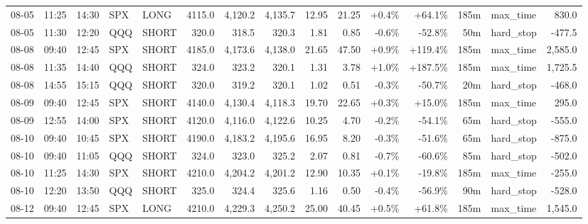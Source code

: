 \documentclass[11pt,a4paper,twoside]{article}
\begin{document}
\begin{landscape}
\begin{center}
\begin{longtable}{>{\color{txtmain}}l l l l l r r r r r r r r >{\color{txtmain}}l r}
08-05 & 11:25 & 14:30 & SPX & LONG & 4115.0 & 4,120.2 & 4,135.7 & 12.95 & 21.25 & \textcolor{wingreen}{+0.4\%} & \textcolor{wingreen}{+64.1\%} & 185m & max\_time & \textcolor{wingreen}{830.0} \\
08-05 & 11:30 & 12:20 & QQQ & SHORT & 320.0 & 318.5 & 320.3 & 1.81 & 0.85 & \textcolor{lossred}{-0.6\%} & \textcolor{lossred}{-52.8\%} & 50m & hard\_stop & \textcolor{lossred}{-477.5} \\
08-08 & 09:40 & 12:45 & SPX & SHORT & 4185.0 & 4,173.6 & 4,138.0 & 21.65 & 47.50 & \textcolor{wingreen}{+0.9\%} & \textcolor{wingreen}{+119.4\%} & 185m & max\_time & \textcolor{wingreen}{2,585.0} \\
08-08 & 11:35 & 14:40 & QQQ & SHORT & 324.0 & 323.2 & 320.1 & 1.31 & 3.78 & \textcolor{wingreen}{+1.0\%} & \textcolor{wingreen}{+187.5\%} & 185m & max\_time & \textcolor{wingreen}{1,725.5} \\
08-08 & 14:55 & 15:15 & QQQ & SHORT & 320.0 & 319.2 & 320.1 & 1.02 & 0.51 & \textcolor{lossred}{-0.3\%} & \textcolor{lossred}{-50.7\%} & 20m & hard\_stop & \textcolor{lossred}{-468.0} \\
08-09 & 09:40 & 12:45 & SPX & SHORT & 4140.0 & 4,130.4 & 4,118.3 & 19.70 & 22.65 & \textcolor{wingreen}{+0.3\%} & \textcolor{wingreen}{+15.0\%} & 185m & max\_time & \textcolor{wingreen}{295.0} \\
08-09 & 12:55 & 14:00 & SPX & SHORT & 4120.0 & 4,116.0 & 4,122.6 & 10.25 & 4.70 & \textcolor{lossred}{-0.2\%} & \textcolor{lossred}{-54.1\%} & 65m & hard\_stop & \textcolor{lossred}{-555.0} \\
08-10 & 09:40 & 10:45 & SPX & SHORT & 4190.0 & 4,183.2 & 4,195.6 & 16.95 & 8.20 & \textcolor{lossred}{-0.3\%} & \textcolor{lossred}{-51.6\%} & 65m & hard\_stop & \textcolor{lossred}{-875.0} \\
08-10 & 09:40 & 11:05 & QQQ & SHORT & 324.0 & 323.0 & 325.2 & 2.07 & 0.81 & \textcolor{lossred}{-0.7\%} & \textcolor{lossred}{-60.6\%} & 85m & hard\_stop & \textcolor{lossred}{-502.0} \\
08-10 & 11:25 & 14:30 & SPX & SHORT & 4210.0 & 4,204.2 & 4,201.2 & 12.90 & 10.35 & \textcolor{wingreen}{+0.1\%} & \textcolor{lossred}{-19.8\%} & 185m & max\_time & \textcolor{lossred}{-255.0} \\
08-10 & 12:20 & 13:50 & QQQ & SHORT & 325.0 & 324.4 & 325.6 & 1.16 & 0.50 & \textcolor{lossred}{-0.4\%} & \textcolor{lossred}{-56.9\%} & 90m & hard\_stop & \textcolor{lossred}{-528.0} \\
08-12 & 09:40 & 12:45 & SPX & LONG & 4210.0 & 4,229.3 & 4,250.2 & 25.00 & 40.45 & \textcolor{wingreen}{+0.5\%} & \textcolor{wingreen}{+61.8\%} & 185m & max\_time & \textcolor{wingreen}{1,545.0} \\

\end{longtable}
\end{center}
\end{landscape}
\end{document}
